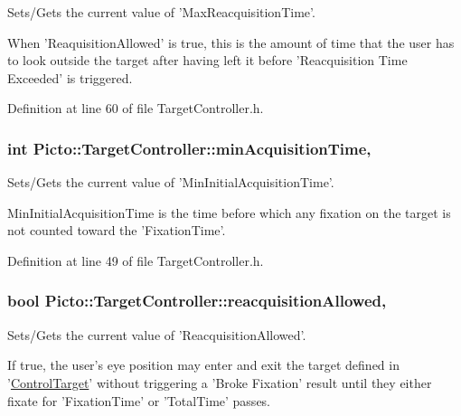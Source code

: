 Sets/\-Gets the current value of 'Max\-Reacquisition\-Time'. 

When 'Reaquisition\-Allowed' is true, this is the amount of time that the user has to look outside the target after having left it before 'Reacquisition Time Exceeded' is triggered. 

Definition at line 60 of file Target\-Controller.\-h.

\hypertarget{class_picto_1_1_target_controller_af01d5d25f96ea79072310f7ce36d55d9}{
\subsubsection[{min\-Acquisition\-Time}]{\setlength{\rightskip}{0pt plus 5cm}int Picto\-::\-Target\-Controller\-::min\-Acquisition\-Time\hspace{0.3cm}{\ttfamily [read]}, {\ttfamily [write]}}}\label{class_picto_1_1_target_controller_af01d5d25f96ea79072310f7ce36d55d9}


Sets/\-Gets the current value of 'Min\-Initial\-Acquisition\-Time'. 

Min\-Initial\-Acquisition\-Time is the time before which any fixation on the target is not counted toward the 'Fixation\-Time'. 

Definition at line 49 of file Target\-Controller.\-h.

\hypertarget{class_picto_1_1_target_controller_a2ebc5e6938143b689fea1375e4dbac60}{
\subsubsection[{reacquisition\-Allowed}]{\setlength{\rightskip}{0pt plus 5cm}bool Picto\-::\-Target\-Controller\-::reacquisition\-Allowed\hspace{0.3cm}{\ttfamily [read]}, {\ttfamily [write]}}}\label{class_picto_1_1_target_controller_a2ebc5e6938143b689fea1375e4dbac60}


Sets/\-Gets the current value of 'Reacquisition\-Allowed'. 

If true, the user's eye position may enter and exit the target defined in '\hyperlink{class_picto_1_1_control_target}{Control\-Target}' without triggering a 'Broke Fixation' result until they either fixate for 'Fixation\-Time' or 'Total\-Time' passes. 

